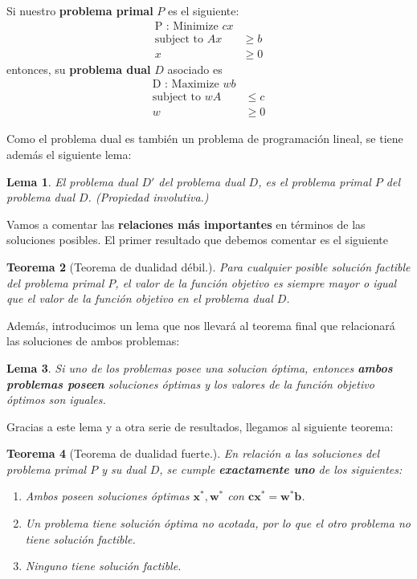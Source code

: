 \documentclass[a4paper]{article}
\newtheorem{thm}{Teorema}
\newtheorem{lema}[thm]{Lema}
\begin{document}
Si nuestro \textbf{problema primal} \(P\) es el siguiente:
\begin{align*}
\text{P : Minimize }  cx &\\
\text{subject to } Ax & \geq b\\
 x & \geq 0
\end{align*}
entonces, su \textbf{problema dual} \(D\) asociado es 
\begin{align*}
  \text{D : Maximize }  wb &\\
  \text{subject to }  wA & \leq c\\
   w & \geq 0
\end{align*}

Como el problema dual es también un problema de programación lineal, se tiene además el siguiente lema:

\begin{lema}
El problema dual \(D'\) del problema dual \(D\), es el problema primal \(P\) del problema dual \(D\). (\emph{Propiedad involutiva.})
\end{lema}

Vamos a comentar las \textbf{relaciones más importantes} en términos de las soluciones posibles. El primer resultado que debemos comentar es el siguiente

\begin{thm}[Teorema de dualidad débil.]
Para cualquier posible solución factible del problema primal \(P\), el valor de la función objetivo es siempre mayor o igual que el valor de la función objetivo en el problema dual \(D\). 
\end{thm}

Además, introducimos un lema que nos llevará al teorema final que relacionará las soluciones de ambos problemas:

\begin{lema}
Si uno de los problemas posee una solucion óptima, entonces \textbf{ambos problemas poseen} soluciones óptimas y los valores de la función objetivo óptimos son iguales.
\end{lema}

Gracias a este lema y a otra serie de resultados, llegamos al siguiente teorema:

\begin{thm}[Teorema de dualidad fuerte.]
En relación a las soluciones del problema primal \(P\) y su dual \(D\), se cumple \textbf{exactamente uno} de los siguientes:
\begin{enumerate}

\item Ambos poseen soluciones óptimas \(\mathbf{x}^*, \mathbf{w}^*\) con \(\mathbf{c}\mathbf{x}^* = \mathbf{w}^*\mathbf{b}\).
\item Un problema tiene solución óptima no acotada, por lo que el otro problema no tiene solución factible.
\item Ninguno tiene solución factible.
\end{enumerate}
\end{thm}
\end{document}
